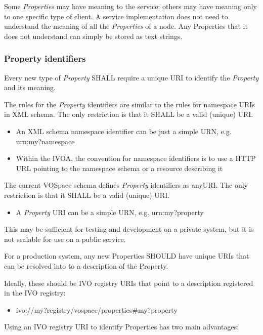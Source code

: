 \documentclass[11pt,a4paper]{ivoa}
\begin{document}
Some \emph{Properties} may have meaning to the service; others may have meaning only to one specific type of client. A service implementation does not need to understand the meaning of all the \emph{Properties} of a node. Any Properties that it does not understand can simply be stored as text strings.

\subsubsection{Property identifiers}
\label{subsubsec:property identifiers}
Every new type of \emph{Property} SHALL require a unique URI to identify the \emph{Property} and its meaning.

The rules for the \emph{Property} identifiers are similar to the rules for namespace URIs in XML schema. The only restriction is that it SHALL be a valid (unique) URI.

\begin{itemize}
    \item An XML schema namespace identifier can be just a simple URN, e.g. urn:my?namespace
    \item Within the IVOA, the convention for namespace identifiers is to use a HTTP URL pointing to the namespace schema or a resource describing it
\end{itemize}

The current VOSpace schema defines \emph{Property} identifiers as anyURI. The only restriction is that it SHALL be a valid (unique) URI.

\begin{itemize}
    \item A \emph{Property} URI can be a simple URN, e.g. urn:my?property
\end{itemize}

This may be sufficient for testing and development on a private system, but it is not scalable for use on a public service.

For a production system, any new Properties SHOULD have unique URIs that can be resolved into to a description of the Property.

Ideally, these should be IVO registry URIs that point to a description registered in the IVO registry:

\begin{itemize}
    \item ivo://my?registry/vospace/properties\#my?property
\end{itemize}

Using an IVO registry URI to identify Properties has two main advantages:
\end{document}
